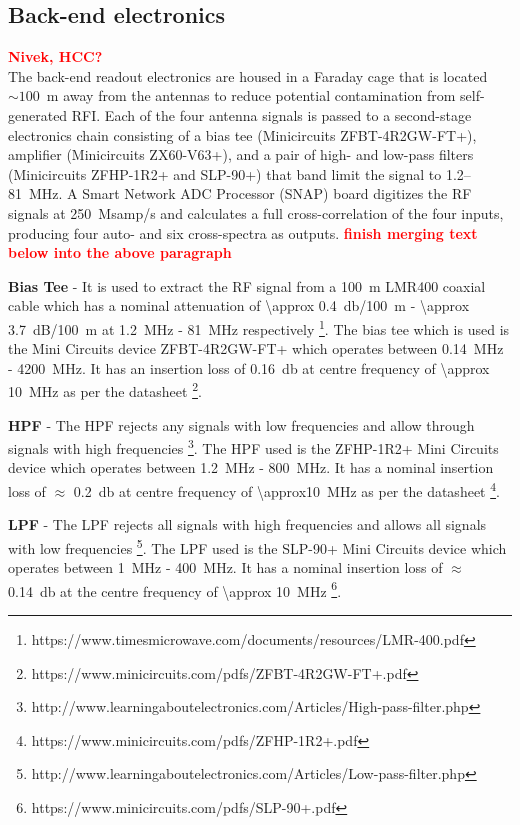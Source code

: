 \documentclass{ws-jai}
\begin{document}
\subsection{Back-end electronics}
\textcolor{red}{\bf Nivek, HCC?} \\

The back-end readout electronics are housed in a Faraday cage that is
located $\sim 100$~m away from the antennas to reduce potential
contamination from self-generated RFI.  Each of the four antenna
signals is passed to a second-stage electronics chain consisting of a
bias tee (Minicircuits ZFBT-4R2GW-FT+), amplifier (Minicircuits
ZX60-V63+), and a pair of high- and low-pass filters (Minicircuits
ZFHP-1R2+ and SLP-90+) that band limit the signal to
1.2--\SI{81}{MHz}.  A Smart Network ADC Processor (SNAP) board
digitizes the RF signals at 250~Msamp/s and calculates a full
cross-correlation of the four inputs, producing four auto- and six
cross-spectra as outputs.  \textcolor{red}{\bf finish merging text
  below into the above paragraph}

\textbf{Bias Tee} - It is used to extract the RF signal from a
\SI{100}{\metre} LMR400 coaxial cable which has a nominal attenuation
of \SI{\approx 0.4}{\decibel/\SI{100}{m}} - \SI{\approx
  3.7}{dB/\SI{100}{\metre}} at \SI{1.2}{MHz} - \SI{81}{MHz}
respectively \footnote{https://www.timesmicrowave.com/documents/resources/LMR-400.pdf}. The
bias tee which is used is the Mini Circuits device ZFBT-4R2GW-FT+
which operates between \SI{0.14}{MHz} - \SI{4200}{MHz}. It has an
insertion loss of \SI{0.16}{\decibel} at centre frequency of
\SI{\approx 10}{MHz} as per the
datasheet \footnote{https://www.minicircuits.com/pdfs/ZFBT-4R2GW-FT+.pdf}.

\textbf{HPF} - The HPF rejects any signals with low frequencies and
allow through signals with high
frequencies \footnote{http://www.learningaboutelectronics.com/Articles/High-pass-filter.php}. The
HPF used is the ZFHP-1R2+ Mini Circuits device which operates between
\SI{1.2}{MHz} - \SI{800}{MHz}. It has a nominal insertion loss of
$\approx$ \SI{0.2}{\decibel} at centre frequency of
\SI{\approx10}{MHz} as per the
datasheet \footnote{https://www.minicircuits.com/pdfs/ZFHP-1R2+.pdf}.

\textbf{LPF} - The LPF rejects all signals with high frequencies and
allows all signals with low
frequencies \footnote{http://www.learningaboutelectronics.com/Articles/Low-pass-filter.php}. The
LPF used is the SLP-90+ Mini Circuits device which operates between
\SI{1}{MHz} - \SI{400}{MHz}. It has a nominal insertion loss of
$\approx$ \SI{0.14}{\decibel} at the centre frequency of \SI{\approx
  10}{MHz} \footnote{https://www.minicircuits.com/pdfs/SLP-90+.pdf}.
\end{document}
